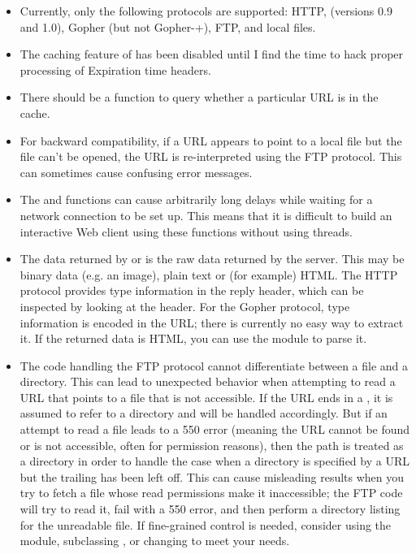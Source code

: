 \begin{itemize}

\item
Currently, only the following protocols are supported: HTTP, (versions
0.9 and 1.0), Gopher (but not Gopher-+), FTP, and local files.

\item
The caching feature of  has been disabled
until I find the time to hack proper processing of Expiration time
headers.

\item
There should be a function to query whether a particular URL is in
the cache.

\item
For backward compatibility, if a URL appears to point to a local file
but the file can't be opened, the URL is re-interpreted using the FTP
protocol.  This can sometimes cause confusing error messages.

\item
The  and  functions can
cause arbitrarily long delays while waiting for a network connection
to be set up.  This means that it is difficult to build an interactive
Web client using these functions without using threads.

\item
The data returned by  or 
is the raw data returned by the server.  This may be binary data
(e.g. an image), plain text or (for example) HTML.  The
HTTP protocol provides type information in the
reply header, which can be inspected by looking at the
 header.  For the
Gopher protocol, type information is encoded
in the URL; there is currently no easy way to extract it.  If the
returned data is HTML, you can use the module
 to parse it.

\item
The code handling the FTP protocol cannot differentiate
between a file and a directory.  This can lead to unexpected behavior
when attempting to read a URL that points to a file that is not
accessible.  If the URL ends in a \code{/}, it is assumed to refer to
a directory and will be handled accordingly.  But if an attempt to
read a file leads to a 550 error (meaning the URL cannot be found or
is not accessible, often for permission reasons), then the path is
treated as a directory in order to handle the case when a directory is
specified by a URL but the trailing \code{/} has been left off.  This can
cause misleading results when you try to fetch a file whose read
permissions make it inaccessible; the FTP code will try to read it,
fail with a 550 error, and then perform a directory listing for the
unreadable file. If fine-grained control is needed, consider using the
 module, subclassing , or changing
 to meet your needs.


\end{itemize}
